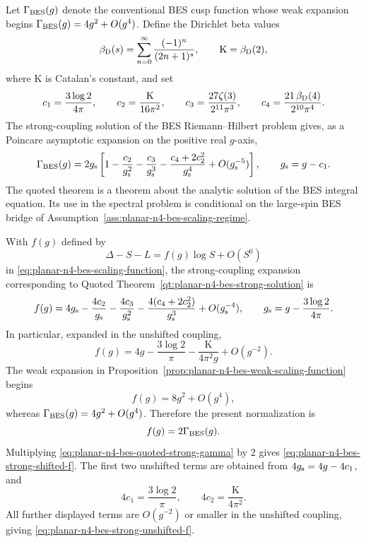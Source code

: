 \begin{quotedtheorem}
\label{qt:planar-n4-bes-strong-solution}
Let \(\Gamma_{\rm BES}(g)\) denote the conventional BES cusp function whose
weak expansion begins \(\Gamma_{\rm BES}(g)=4g^2+O(g^4)\).  Define the
Dirichlet beta values
\[
  \beta_{\rm D}(s)=\sum_{n=0}^{\infty}\frac{(-1)^n}{(2n+1)^s},
  \qquad
  \mathrm K=\beta_{\rm D}(2),
\]
where \(\mathrm K\) is Catalan's constant, and set
\[
  c_1=\frac{3\log2}{4\pi},\qquad
  c_2=\frac{\mathrm K}{16\pi^2},\qquad
  c_3=\frac{27\zeta(3)}{2^{11}\pi^3},\qquad
  c_4=\frac{21\,\beta_{\rm D}(4)}{2^{10}\pi^4}.
\]
The strong-coupling solution of the BES Riemann--Hilbert problem gives, as a
Poincare asymptotic expansion on the positive real \(g\)-axis,
\begin{equation}
  \Gamma_{\rm BES}(g)
  =
  2g_{\rm s}
  \left[
    1-\frac{c_2}{g_{\rm s}^2}
    -\frac{c_3}{g_{\rm s}^3}
    -\frac{c_4+2c_2^2}{g_{\rm s}^4}
    +O(g_{\rm s}^{-5})
  \right],
  \qquad
  g_{\rm s}=g-c_1 .
  \label{eq:planar-n4-bes-quoted-strong-gamma}
\end{equation}
The quoted theorem is a theorem about the analytic solution of the BES
integral equation.  Its use in the spectral problem is conditional on the
large-spin BES bridge of
Assumption~\ref{ass:planar-n4-bes-scaling-regime}.
\end{quotedtheorem}

\begin{remark}
\label{prop:planar-n4-bes-strong-monograph-normalization}
With \(f(g)\) defined by
\[
  \Delta-S-L=f(g)\log S+O(S^0)
\]
in \eqref{eq:planar-n4-bes-scaling-function}, the strong-coupling expansion
corresponding to
Quoted Theorem~\ref{qt:planar-n4-bes-strong-solution} is
\begin{equation}
  f(g)
  =
  4g_{\rm s}
  -\frac{4c_2}{g_{\rm s}}
  -\frac{4c_3}{g_{\rm s}^2}
  -\frac{4(c_4+2c_2^2)}{g_{\rm s}^3}
  +O(g_{\rm s}^{-4}),
  \qquad
  g_{\rm s}=g-\frac{3\log2}{4\pi}.
  \label{eq:planar-n4-bes-strong-shifted-f}
\end{equation}
In particular, expanded in the unshifted coupling,
\begin{equation}
  f(g)
  =
  4g-\frac{3\log2}{\pi}
  -\frac{\mathrm K}{4\pi^2g}
  +O(g^{-2}).
  \label{eq:planar-n4-bes-strong-unshifted-f}
\end{equation}
The weak expansion in
Proposition~\ref{prop:planar-n4-bes-weak-scaling-function} begins
\[
  f(g)=8g^2+O(g^4),
\]
whereas \(\Gamma_{\rm BES}(g)=4g^2+O(g^4)\).  Therefore the present
normalization is
\[
  f(g)=2\Gamma_{\rm BES}(g).
\]
Multiplying \eqref{eq:planar-n4-bes-quoted-strong-gamma} by \(2\) gives
\eqref{eq:planar-n4-bes-strong-shifted-f}.  The first two unshifted terms are
obtained from \(4g_{\rm s}=4g-4c_1\), and
\[
  4c_1=\frac{3\log2}{\pi},\qquad
  4c_2=\frac{\mathrm K}{4\pi^2}.
\]
All further displayed terms are \(O(g^{-2})\) or smaller in the unshifted
coupling, giving \eqref{eq:planar-n4-bes-strong-unshifted-f}.
\end{remark}

